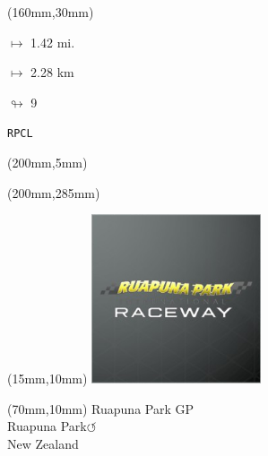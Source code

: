 \begin{textblock*}{40mm}(160mm,30mm)%
\Large
\par$\mapsto$ 1.42 mi.
\par$\mapsto$ 2.28 km
\par$\looparrowright$ 9
\par\hfill\tiny\tt RPCL\\
\end{textblock*}
\begin{textblock*}{20mm}(200mm,5mm)%
\fbox{\thepage}
\label{RPCL}
\end{textblock*}
\begin{textblock*}{20mm}(200mm,285mm)%
\fbox{\thepage}
\end{textblock*}

\null\newpage
\begin{textblock*}{50mm}(15mm,10mm)%
\includegraphics[width=50mm]{LG/RUPU.png}
\end{textblock*}
\begin{textblock*}{130mm}(70mm,10mm)%
{\fontsize{20}{20}\selectfont Ruapuna Park GP\\}
{\fontsize{16}{16}\selectfont Ruapuna Park\hfill \huge$\circlearrowleft$\\}
{\fontsize{12}{12}\selectfont New Zealand\\}
\end{textblock*}
